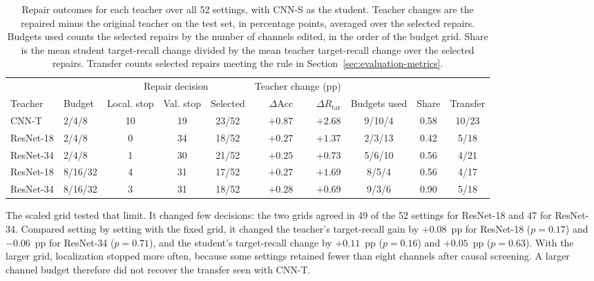 \documentclass[10pt,journal,compsoc]{IEEEtran}
\theoremstyle{definition}
\begin{document}
\begin{table}[!t]
\caption{Repair outcomes for each teacher over all 52 settings, with
CNN-S as the student. Teacher changes are the repaired minus the
original teacher on the test set, in percentage points, averaged over
the selected repairs. Budgets used counts the selected repairs by the
number of channels edited, in the order of the budget grid. Share is
the mean student target-recall change divided by the mean teacher
target-recall change over the selected repairs. Transfer counts
selected repairs meeting the rule in
Section~\ref{sec:evaluation-metrics}.}
\label{tab:teacher-architecture-results}
\centering
\footnotesize
\setlength{\tabcolsep}{4pt}
\renewcommand{\arraystretch}{1.1}
\vspace{-3pt}
\begin{tabular}{@{}llcccrrccc@{}}
\toprule
& & \multicolumn{3}{c}{Repair decision}
& \multicolumn{2}{c}{Teacher change (pp)} & & & \\
\cmidrule(lr){3-5}\cmidrule(lr){6-7}
Teacher & Budget & Local. stop & Val. stop & Selected
& $\Delta\mathrm{Acc}$ & $\Delta R_{\mathrm{tar}}$
& Budgets used & Share & Transfer \\
\midrule
CNN-T & 2/4/8 & 10 & 19 & 23/52 & $+0.87$ & $+2.68$ & 9/10/4 & 0.58 & 10/23 \\
ResNet-18 & 2/4/8 & 0 & 34 & 18/52 & $+0.27$ & $+1.37$ & 2/3/13 & 0.42 & 5/18 \\
ResNet-34 & 2/4/8 & 1 & 30 & 21/52 & $+0.25$ & $+0.73$ & 5/6/10 & 0.56 & 4/21 \\
ResNet-18 & 8/16/32 & 4 & 31 & 17/52 & $+0.27$ & $+1.69$ & 8/5/4 & 0.56 & 4/17 \\
ResNet-34 & 8/16/32 & 3 & 31 & 18/52 & $+0.28$ & $+0.69$ & 9/3/6 & 0.90 & 5/18 \\
\bottomrule
\end{tabular}
\end{table}

The scaled grid tested that limit. It changed few decisions: the two
grids agreed in 49 of the 52 settings for ResNet-18 and 47 for
ResNet-34. Compared setting by setting with the fixed grid, it changed
the teacher's target-recall gain by $+0.08$~pp for ResNet-18
($p=0.17$) and $-0.06$~pp for ResNet-34 ($p=0.71$), and the student's
target-recall change by $+0.11$~pp ($p=0.16$) and $+0.05$~pp
($p=0.63$). With the larger grid, localization stopped more often,
because some settings retained fewer than eight channels after causal
screening. A larger channel budget therefore did not recover the transfer
seen with CNN-T.
\end{document}
